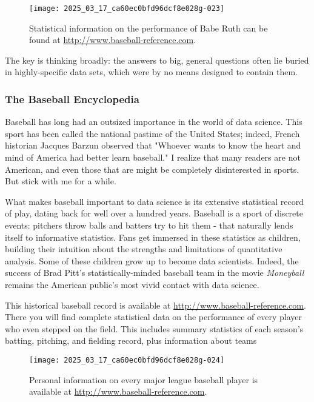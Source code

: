\documentclass[10pt]{article}
\begin{document}
\begin{figure}[h]
    \centering
    \texttt{[image: 2025\_03\_17\_ca60ec0bfd96dcf8e028g-023]}
    \caption{Statistical information on the performance of Babe Ruth can be found at \href{http://www.baseball-reference.com}{http://www.baseball-reference.com}.}
\end{figure}

The key is thinking broadly: the answers to big, general questions often lie buried in highly-specific data sets, which were by no means designed to contain them.

\subsubsection*{The Baseball Encyclopedia}
Baseball has long had an outsized importance in the world of data science. This sport has been called the national pastime of the United States; indeed, French historian Jacques Barzun observed that "Whoever wants to know the heart and mind of America had better learn baseball." I realize that many readers are not American, and even those that are might be completely disinterested in sports. But stick with me for a while.

What makes baseball important to data science is its extensive statistical record of play, dating back for well over a hundred years. Baseball is a sport of discrete events: pitchers throw balls and batters try to hit them - that naturally lends itself to informative statistics. Fans get immersed in these statistics as children, building their intuition about the strengths and limitations of quantitative analysis. Some of these children grow up to become data scientists. Indeed, the success of Brad Pitt's statistically-minded baseball team in the movie \textit{Moneyball} remains the American public's most vivid contact with data science.

This historical baseball record is available at \href{http://www.baseball-reference.com}{http://www.baseball-reference.com}. There you will find complete statistical data on the performance of every player who even stepped on the field. This includes summary statistics of each season's batting, pitching, and fielding record, plus information about teams

\begin{figure}[h]
    \centering
    \texttt{[image: 2025\_03\_17\_ca60ec0bfd96dcf8e028g-024]}
    \caption{Personal information on every major league baseball player is available at \href{http://www.baseball-reference.com}{http://www.baseball-reference.com}.}
\end{figure}
\end{document}
